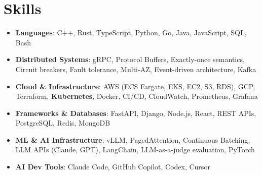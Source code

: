 \documentclass[letterpaper,11pt]{article}
\newcommand{\resumeSubHeadingListStart}{\begin{itemize}[leftmargin=0.15in, label={}]}
\newcommand{\resumeSubHeadingListEnd}{\end{itemize}}
\newcommand{\resumeSkillHeading}[2]{%
  \item\small{\textbf{#1}: #2 \vspace{-9pt}}%
}
\begin{document}
\section{Skills}
  \resumeSubHeadingListStart
    \resumeSkillHeading{Languages}{C++, Rust, TypeScript, Python, Go, Java, JavaScript, SQL, Bash}
    \resumeSkillHeading{Distributed Systems}{gRPC, Protocol Buffers, Exactly-once semantics, Circuit breakers, Fault tolerance, Multi-AZ, Event-driven architecture, Kafka}
    \resumeSkillHeading{Cloud \& Infrastructure}{AWS (ECS Fargate, EKS, EC2, S3, RDS), GCP, Terraform, \textbf{Kubernetes}, Docker, CI/CD, CloudWatch, Prometheus, Grafana}
    \resumeSkillHeading{Frameworks \& Databases}{FastAPI, Django, Node.js, React, REST APIs, PostgreSQL, Redis, MongoDB}
    \resumeSkillHeading{ML \& AI Infrastructure}{vLLM, PagedAttention, Continuous Batching, LLM APIs (Claude, GPT), LangChain, LLM-as-a-judge evaluation, PyTorch}
    \resumeSkillHeading{AI Dev Tools}{Claude Code, GitHub Copilot, Codex, Cursor}
  \resumeSubHeadingListEnd
\end{document}
